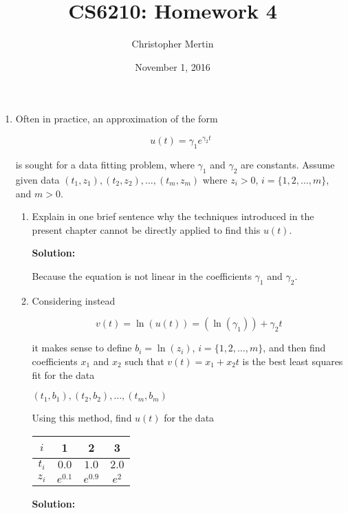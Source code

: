 \documentclass[12pt]{article}
\begin{document}
\title{CS6210: Homework 4}
\author{Christopher Mertin}
\date{November 1, 2016}
\maketitle

\begin{enumerate}
\item Often in practice, an approximation of the form

\[
u(t) = \gamma_{1}e^{\gamma_{2}t}
\]

is sought for a data fitting problem, where $\gamma_{1}$ and $\gamma_{2}$ are
constants. Assume given data $\left(t_{1}, z_{1}\right),\left(t_{2}, z_{2}\right),\ldots,\left(t_{m}, z_{m}\right)$
where $z_{i} > 0$, $i = \{ 1,2,\ldots,m\}$, and $m > 0$.

\begin{enumerate}
\item Explain in one brief sentence why the techniques introduced in the present
chapter cannot be directly applied to find this $u(t)$.

{\bf Solution:}

Because the equation is not linear in the coefficients $\gamma_{1}$ and $\gamma_{2}$.

\item Considering instead

\[
v(t) = \ln\left( u(t)\right) = \left(\ln\left( \gamma_{1}\right)\right) + \gamma_{2}t
\]

it makes sense to define $b_{i} = \ln\left( z_{i}\right)$, $i = \{ 1,2,\ldots,m\}$,
and then find coefficients $x_{1}$ and $x_{2}$ such that $v(t) = x_{1} + x_{2}t$
is the best least squares fit for the data

$\left(t_{1}, b_{1}\right),\left(t_{2}, b_{2}\right),\ldots,\left(t_{m}, b_{m}\right)$

Using this method, find $u(t)$ for the data

\begin{table}[H]
  \centering
\begin{tabular}{| c | c | c | c |}
  \hline
$i$ & 1 & 2 & 3\\
\hline
$t_{i}$ & $0.0$ & $1.0$ & $2.0$\\
\hline
$z_{i}$ & $e^{0.1}$ & $e^{0.9}$ & $e^{2}$\\
\hline
\end{tabular}
\end{table}

{\bf Solution:}


\end{enumerate}
\end{enumerate}
\end{document}
